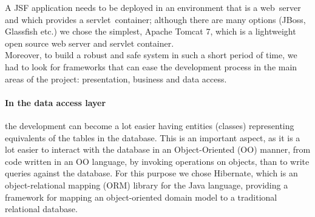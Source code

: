 \noindent A JSF application needs to be deployed in an environment that is a web~server and which provides a servlet~container; although there are many options (JBoss, Glassfish etc.) we chose the simplest, Apache Tomcat 7, which is a lightweight open source web server and servlet container.
\\

\noindent Moreover, to build a robust and safe system in such a short period of time, we had to look for frameworks that can ease the development process in the main areas of the project: presentation, business and data access.

\paragraph{In the data access layer} the development can become a lot easier having entities (classes) representing equivalents of the tables in the database. This is an important aspect, as it is a lot easier to interact with the database in an Object-Oriented (OO) manner, from code written in an OO language, by invoking operations on objects, than to write queries against the database. For this purpose we chose Hibernate, which is an object-relational mapping (ORM) library for the Java language, providing a framework for mapping an object-oriented domain model to a traditional relational database.

